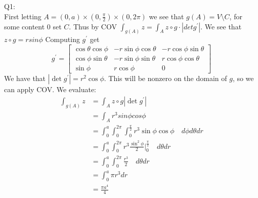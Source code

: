 \documentclass[letterpaper]{article}
\begin{document}
\noindent Q1:\\
First letting $A = (0,a)\times (0,\frac{\pi}{2}) \times (0, 2\pi)$ we see that $g(A)=V\setminus C$, for some content 0 set $C$. Thus by COV $\int_{g(A)} z = \int_A z\circ g \cdot |det g^\prime|$. We see that $z\circ g = r sin\phi$
Computing $g^\prime $ get $$ g^\prime =  \begin{bmatrix}  \cos\theta\cos\phi & -r \sin\phi\cos\theta & -r\cos\phi \sin\theta \\ \cos\phi\sin\theta & -r \sin\phi \sin\theta & r\cos\phi \cos\theta  \\ \sin\phi & r\cos\phi & 0 \end{bmatrix}$$
We have that $|\det g^\prime| = r^2 \cos\phi$. This will be nonzero on the domain of $g$, so we can apply COV. 
We evaluate: 
\begin{align*}
     \int_{g(A)} z &= \int_A z\circ g |\det g^\prime| \tag{by COV}
    \\ & = \int_A r^3 sin\phi cos\phi
    \\ & = \int_0^a \int_0^{2\pi} \int_0^{\frac{\pi}{2}} r^3 \sin\phi \cos\phi \quad d\phi d\theta dr \tag{by Fubini's Theorem}
    \\ & = \int_0^a \int_0^{2\pi} r^3 \frac{\sin^2 \phi}{2}\bigg|_0^\frac{\pi}{2} \quad d\theta dr 
    \\ & = \int_0^a \int_0^{2\pi} \frac{r^3}{2} \quad d\theta dr 
    \\ & = \int_0^a \pi r^3 dr
    \\ & = \frac{\pi a^4}{4}
\end{align*}
\end{document}
